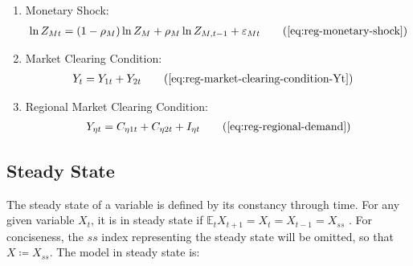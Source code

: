 \documentclass[
thesis.tex
]{subfiles}
\begin{document}
{\begin{itemize}
\begin{enumerate}
		\item Monetary Shock:
		\begin{align}
			\ln{Z_{Mt}} = (1-\rho_M)\ln{Z_{M}} + \rho_M\ln{Z_{M,t-1}} + \varepsilon_{Mt} \tag{\ref{eq:reg-monetary-shock}}
		\end{align}

		\item Market Clearing Condition:
		\begin{align}
			Y_{t} &= Y_{1 t} + Y_{2 t} \tag{\ref{eq:reg-market-clearing-condition-Yt}}
		\end{align}

		\begin{comment}
	
		\end{comment}
		
		\item Regional Market Clearing Condition:
		\begin{align}
			Y_{\eta t} = C_{\eta 1 t} + C_{\eta 2 t} + I_{\eta t} \tag{\ref{eq:reg-regional-demand}}
		\end{align}
			
		\end{enumerate}
		
	\end{itemize}
	
} %



\subsection{Steady State}

The steady state of a variable is defined by its constancy through time. For any given variable $X_t$, it is in steady state if $\mathbb{E}_t X_{t+1} = X_t = X_{t-1} = X_{ss}$ \cite[p.41]{costa_junior_understanding_2016}. For conciseness, the $ss$ index representing the steady state will be omitted, so that $X \coloneq X_{ss}$. The model in steady state is:
\end{document}
